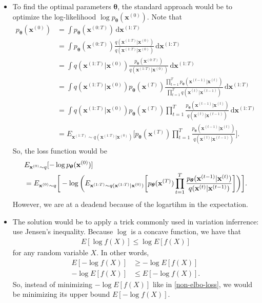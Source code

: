 \documentclass[10pt]{article}
\newcommand{\dee}{\mathrm{d}}
\newcommand{\ve}[1]{\mathbf{#1}}
\newcommand{\ves}[1]{\boldsymbol{#1}}
\begin{document}
\begin{itemize}
  \item To find the optimal parameters $\ves{\theta}$, the standard approach would be to optimize the log-likelihood $\log p_{\ves{\theta}}(\ve{x}^{(0)})$. Note that
  \begin{align*}
    p_{\ves{\theta}}(\ve{x}^{(0)}) 
    &= \int p_{\ves{\theta}}(\ve{x}^{(0:T) })\, \dee\ve{x}^{(1:T)} \\
    &= \int p_{\ves{\theta}}(\ve{x}^{(0:T) }) \frac{q(\ve{x}^{(1:T)}|\ve{x}^{(0)})}{q(\ve{x}^{(1:T)}|\ve{x}^{(0)})}\, \dee\ve{x}^{(1:T)} \\
    &= \int q(\ve{x}^{(1:T)}|\ve{x}^{(0)}) \frac{p_{\ves{\theta}}(\ve{x}^{(0:T) })}{q(\ve{x}^{(1:T)}|\ve{x}^{(0)})}\, \dee\ve{x}^{(1:T)}\\
    &= \int q(\ve{x}^{(1:T)}|\ve{x}^{(0)}) p_{\ves{\theta}}(\ve{x}^{(T)}) \frac{\prod_{t=1}^T p_{\ves{\theta}}(\ve{x}^{(t-1)}|\ve{x}^{(t)})}{\prod_{t=1}^T q(\ve{x}^{(t)}|\ve{x}^{(t-1)})}\, \dee\ve{x}^{(1:T)}\\
    &= \int q(\ve{x}^{(1:T)}|\ve{x}^{(0)}) p_{\ves{\theta}}(\ve{x}^{(T)}) \prod_{t=1}^T \frac{ p_{\ves{\theta}}(\ve{x}^{(t-1)}|\ve{x}^{(t)})}{ q(\ve{x}^{(t)}|\ve{x}^{(t-1)})}\, \dee\ve{x}^{(1:T)} \\
    &= E_{\ve{x}^{(1:T)} \sim q(\ve{x}^{(1:T)}|\ve{x}^{(0)})} \bigg[ p_{\ves{\theta}}(\ve{x}^{(T)}) \prod_{t=1}^T \frac{ p_{\ves{\theta}}(\ve{x}^{(t-1)}|\ve{x}^{(t)})}{ q(\ve{x}^{(t)}|\ve{x}^{(t-1)})} \bigg].
  \end{align*}
  So, the loss function would be
  \begin{align}
    &E_{\ve{x}^{(0)} \sim q} [-\log p_{\ves{\theta}}(\ve{x}^{(0)})] \notag \\
    &= E_{\ve{x}^{(0)} \sim q} \bigg[ -\log \bigg( E_{\ve{x}^{(1:T)} \sim q(\ve{x}^{(1:T)}|\ve{x}^{(0)})} \bigg[ p_{\ves{\theta}}(\ve{x}^{(T)}) \prod_{t=1}^T \frac{ p_{\ves{\theta}}(\ve{x}^{(t-1)}|\ve{x}^{(t)})}{ q(\ve{x}^{(t)}|\ve{x}^{(t-1)})} \bigg] \bigg) \bigg]. \label{non-elbo-loss}
  \end{align}
  However, we are at a deadend because of the logartihm in the expectation.

  \item The solution would be to apply a trick commonly used in variation inferrence: use Jensen's inequality. Because $\log$ is a concave function, we have that
  \begin{align*}
    E [\log f(X)] \leq \log E[f(X)]
  \end{align*}
  for any random variable $X$. In other words,
  \begin{align*}
    E [-\log f(X)] &\geq -\log E[f(X)] \\
    -\log E[f(X)] &\leq E [-\log f(X)].
  \end{align*}  
  So, instead of minimizing $-\log E[f(X)]$ like in \eqref{non-elbo-loss}, we would be minimizing its upper bound $E[-\log f(X)]$.


\end{itemize}
\end{document}

